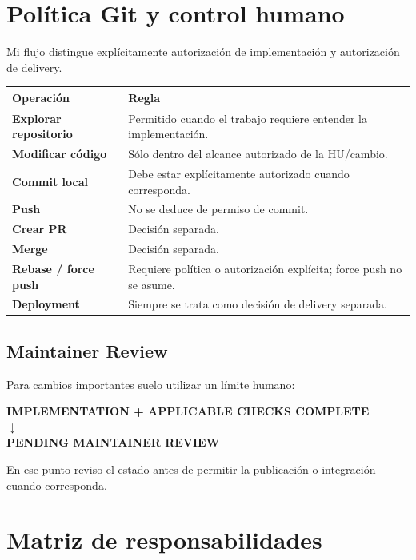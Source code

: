 \documentclass[11pt,a4paper]{article}
\begin{document}
\section{Política Git y control humano}

Mi flujo distingue explícitamente autorización de implementación y autorización de delivery.

\begin{tabularx}{\textwidth}{>{\bfseries}p{}X}
\toprule
Operación & Regla \\
\midrule
Explorar repositorio & Permitido cuando el trabajo requiere entender la implementación. \\
Modificar código & Sólo dentro del alcance autorizado de la HU/cambio. \\
Commit local & Debe estar explícitamente autorizado cuando corresponda. \\
Push & No se deduce de permiso de commit. \\
Crear PR & Decisión separada. \\
Merge & Decisión separada. \\
Rebase / force push & Requiere política o autorización explícita; force push no se asume. \\
Deployment & Siempre se trata como decisión de delivery separada. \\
\bottomrule
\end{tabularx}

\subsection{Maintainer Review}

Para cambios importantes suelo utilizar un límite humano:

\begin{center}
\textbf{IMPLEMENTATION + APPLICABLE CHECKS COMPLETE}\\
\(\downarrow\)\\
\textbf{PENDING MAINTAINER REVIEW}
\end{center}

En ese punto reviso el estado antes de permitir la publicación o integración cuando corresponda.

\section{Matriz de responsabilidades}
\end{document}
